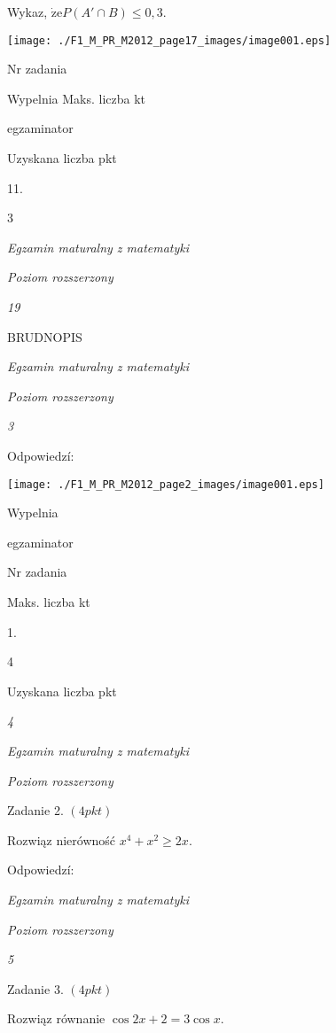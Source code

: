 \documentclass[a4paper,12pt]{article}
\begin{document}
Wykaz, $\dot{\mathrm{z}}\mathrm{e}P(A'\cap B)\leq 0,3.$
\begin{center}
\texttt{[image: ./F1\_M\_PR\_M2012\_page17\_images/image001.eps]}
\end{center}
Nr zadania

Wypelnia Maks. liczba kt

egzaminator

Uzyskana liczba pkt

11.

3





{\it Egzamin maturalny z matematyki}

{\it Poziom rozszerzony}

{\it 19}

BRUDNOPIS





{\it Egzamin maturalny z matematyki}

{\it Poziom rozszerzony}

{\it 3}

Odpowiedzí:
\begin{center}
\texttt{[image: ./F1\_M\_PR\_M2012\_page2\_images/image001.eps]}
\end{center}
Wypelnia

egzaminator

Nr zadania

Maks. liczba kt

1.

4

Uzyskana liczba pkt





{\it 4}

{\it Egzamin maturalny z matematyki}

{\it Poziom rozszerzony}

Zadanie 2. $(4pkt)$

Rozwiąz nierówność $x^{4}+x^{2}\geq 2x.$

Odpowiedzí:





{\it Egzamin maturalny z matematyki}

{\it Poziom rozszerzony}

{\it 5}

Zadanie 3. $(4pkt)$

Rozwiąz równanie $\cos 2x+2=3\cos x.$
\end{document}
